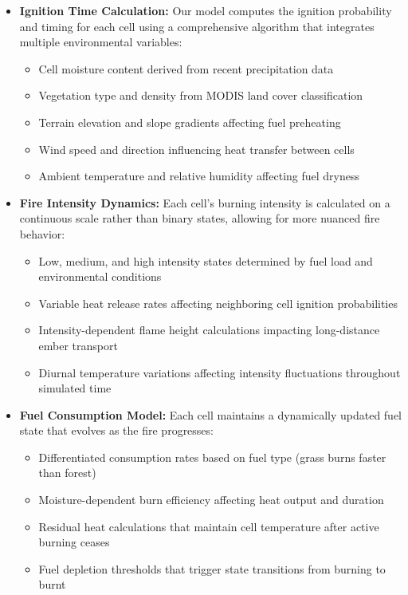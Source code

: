\documentclass[conference]{IEEEtran}
\begin{document}
\begin{itemize}
    \item \textbf{Ignition Time Calculation:} Our model computes the ignition probability and timing for each cell using a comprehensive algorithm that integrates multiple environmental variables:
    \begin{itemize}
        \item Cell moisture content derived from recent precipitation data
        \item Vegetation type and density from MODIS land cover classification
        \item Terrain elevation and slope gradients affecting fuel preheating
        \item Wind speed and direction influencing heat transfer between cells
        \item Ambient temperature and relative humidity affecting fuel dryness
    \end{itemize}
    
    \item \textbf{Fire Intensity Dynamics:} Each cell's burning intensity is calculated on a continuous scale rather than binary states, allowing for more nuanced fire behavior:
    \begin{itemize}
        \item Low, medium, and high intensity states determined by fuel load and environmental conditions
        \item Variable heat release rates affecting neighboring cell ignition probabilities
        \item Intensity-dependent flame height calculations impacting long-distance ember transport
        \item Diurnal temperature variations affecting intensity fluctuations throughout simulated time
    \end{itemize}
    
    \item \textbf{Fuel Consumption Model:} Each cell maintains a dynamically updated fuel state that evolves as the fire progresses:
    \begin{itemize}
        \item Differentiated consumption rates based on fuel type (grass burns faster than forest)
        \item Moisture-dependent burn efficiency affecting heat output and duration
        \item Residual heat calculations that maintain cell temperature after active burning ceases
        \item Fuel depletion thresholds that trigger state transitions from burning to burnt
    \end{itemize}
    

\end{itemize}
\end{document}
